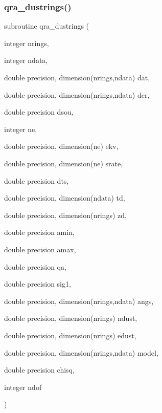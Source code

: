 \mbox{\label{qra__dust_8f_a46f9c812bf42c0fea75fa91455f98652}} 
\subsubsection{\texorpdfstring{qra\+\_\+dustrings()}{qra\_dustrings()}}
{\footnotesize\ttfamily subroutine qra\+\_\+dustrings (\begin{DoxyParamCaption}\item[{integer}]{nrings,  }\item[{integer}]{ndata,  }\item[{double precision, dimension(nrings,ndata)}]{dat,  }\item[{double precision, dimension(nrings,ndata)}]{der,  }\item[{double precision}]{dsou,  }\item[{integer}]{ne,  }\item[{double precision, dimension(ne)}]{ekv,  }\item[{double precision, dimension(ne)}]{srate,  }\item[{double precision}]{dts,  }\item[{double precision, dimension(ndata)}]{td,  }\item[{double precision, dimension(nrings)}]{zd,  }\item[{double precision}]{amin,  }\item[{double precision}]{amax,  }\item[{double precision}]{qa,  }\item[{double precision}]{sig1,  }\item[{double precision, dimension(nrings,ndata)}]{angs,  }\item[{double precision, dimension(nrings)}]{ndust,  }\item[{double precision, dimension(nrings)}]{edust,  }\item[{double precision, dimension(nrings,ndata)}]{model,  }\item[{double precision}]{chisq,  }\item[{integer}]{ndof }\end{DoxyParamCaption})}

\mbox{\label{qra__dust_8f_a40ca5b41eb59b4d866ae8402d69cc74f}} 
